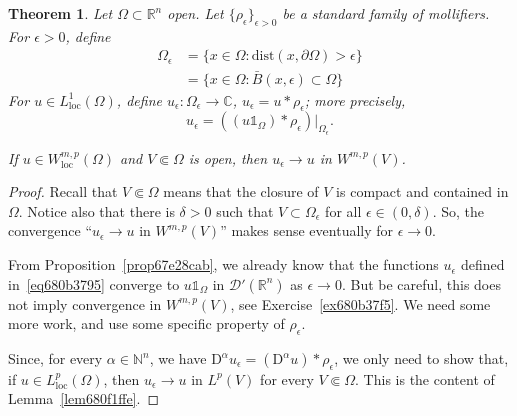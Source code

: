 \documentclass[a4paper,9pt]{amsart}
\newcommand{\scr}[1]{\mathscr{#1}}
\newcommand{\N}{\mathbb{N}}	%
\newcommand{\R}{\mathbb{R}}	%
\newcommand{\C}{\mathbb{C}}	%
\newcommand{\de}{\partial}		%
\newcommand{\Diff}{\mathrm{D}}
\newcommand{\dist}{\mathrm{dist}}
\newcommand{\loc}{\mathrm{loc}}
\newcommand{\one}{{\mathds 1\!}}
\theoremstyle{plain}
\newtheorem{theorem}[proposition]{Theorem}
\theoremstyle{definition}
\theoremstyle{remark}
\begin{document}
\begin{theorem}\label{thm680b49bf}
	Let $\Omega\subset\R^n$ open.
	Let $\{\rho_\epsilon\}_{\epsilon>0}$ be a standard family of mollifiers.
	For $\epsilon>0$, define
	\begin{equation}
	\begin{aligned}
		\Omega_\epsilon &= \{x\in\Omega:\dist(x,\de\Omega)>\epsilon\} \\
		&= \{x\in\Omega: \bar B(x,\epsilon)\subset\Omega\}
	\end{aligned}
	\end{equation}
	For $u\in L^1_\loc(\Omega)$, define $u_\epsilon:\Omega_\epsilon\to\C$,
	$u_\epsilon = u*\rho_\epsilon$;
	more precisely,
	\begin{equation}\label{eq680b3795}
		u_\epsilon = ((u\one_\Omega) * \rho_\epsilon)|_{\Omega_\epsilon} .
	\end{equation}
	
	If $u\in W^{m,p}_\loc(\Omega)$ and $V\Subset\Omega$ is open, then $u_\epsilon \to u$ in $W^{m,p}(V)$.
\end{theorem}
\begin{proof}
	Recall that $V\Subset\Omega$ means that the closure of $V$ is compact and contained in $\Omega$.
	Notice also that there is $\delta>0$ such that $V\subset\Omega_\epsilon$ for all $\epsilon\in(0,\delta)$.
	So, the convergence ``$u_\epsilon \to u$ in $W^{m,p}(V)$'' makes sense eventually for $\epsilon\to0$.
	
	From Proposition~\ref{prop67e28cab}, we already know that the functions $u_\epsilon$ defined in~\eqref{eq680b3795} converge to $u\one_\Omega$ in $\scr D'(\R^n)$ as $\epsilon\to0$.
	But be careful, this does not imply convergence in $W^{m,p}(V)$, see Exercise~\ref{ex680b37f5}.
	We need some more work, and use some specific property of $\rho_\epsilon$.
	
	Since, for every $\alpha\in\N^n$, we have $\Diff^\alpha u_\epsilon = (\Diff^\alpha u)*\rho_\epsilon$, we only need to show that, if $u\in L^p_\loc(\Omega)$, then $u_\epsilon\to u$ in $L^p(V)$ for every $V\Subset \Omega$.
	This is the content of Lemma~\ref{lem680f1ffe}.
\end{proof}
\end{document}
